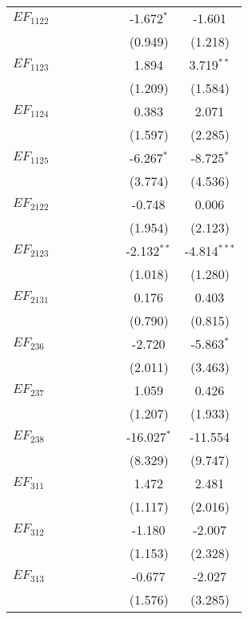 \begin{longtable}[h]{lccccccc}
 $EF_{1122}$ & & & & & & -1.672$^{*}$ & -1.601$^{}$ \\
  & & & & & & (0.949) & (1.218) \\

 $EF_{1123}$& & & & & & 1.894$^{}$ & 3.719$^{**}$ \\
  & & & & & & (1.209) & (1.584) \\

 $EF_{1124}$ & & & & & & 0.383$^{}$ & 2.071$^{}$ \\
  & & & & & & (1.597) & (2.285) \\

 $EF_{1125}$& & & & & & -6.267$^{*}$ & -8.725$^{*}$ \\
  & & & & & & (3.774) & (4.536) \\

 $EF_{2122}$ & & & & & & -0.748$^{}$ & 0.006$^{}$ \\
  & & & & & & (1.954) & (2.123) \\

 $EF_{2123}$ & & & & & & -2.132$^{**}$ & -4.814$^{***}$ \\
  & & & & & & (1.018) & (1.280) \\

 $EF_{2131}$ & & & & & & 0.176$^{}$ & 0.403$^{}$ \\
  & & & & & & (0.790) & (0.815) \\

 $EF_{236}$ & & & & & & -2.720$^{}$ & -5.863$^{*}$ \\
  & & & & & & (2.011) & (3.463) \\

 $EF_{237}$ & & & & & & 1.059$^{}$ & 0.426$^{}$ \\
  & & & & & & (1.207) & (1.933) \\

 $EF_{238}$& & & & & & -16.027$^{*}$ & -11.554$^{}$ \\
  & & & & & & (8.329) & (9.747) \\

 $EF_{311}$ & & & & & & 1.472$^{}$ & 2.481$^{}$ \\
  & & & & & & (1.117) & (2.016) \\

 $EF_{312}$ & & & & & & -1.180$^{}$ & -2.007$^{}$ \\
  & & & & & & (1.153) & (2.328) \\

 $EF_{313}$ & & & & & & -0.677$^{}$ & -2.027$^{}$ \\
  & & & & & & (1.576) & (3.285) \\


\end{longtable}
